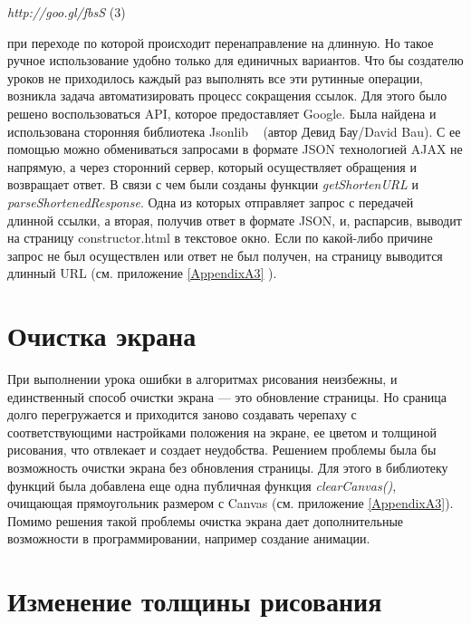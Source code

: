 \begin{center}
\vspace{6mm}
 \textit{ http://goo.gl/fbsS } (3)\par
\end{center}

при переходе по которой происходит перенаправление на длинную. Но такое ручное использование удобно только для единичных вариантов. Что бы создателю уроков не приходилось каждый раз выполнять все эти рутинные операции, возникла задача автоматизировать процесс сокращения ссылок. Для этого было решено воспользоваться API, которое предоставляет Google. Была найдена и использована сторонняя библиотека Jsonlib ~\cite{jsonlib} (автор Девид Бау/David Bau). С ее помощью можно обмениваться запросами в формате JSON технологией AJAX не напрямую, а через сторонний сервер, который осуществляет обращения и возвращает ответ. В связи с чем были созданы функции \textit{getShortenURL} и \textit{parseShortenedResponse}. Одна из которых отправляет запрос с передачей длинной ссылки, а вторая, получив ответ в формате JSON, и, распарсив, выводит на страницу constructor.html в текстовое окно. Если по какой-либо причине запрос не был осуществлен или ответ не был получен, на страницу выводится  длинный URL (см. приложение \ref{AppendixA3} ).



\section{Очистка экрана} \label{sect1_1}

При выполнении урока ошибки в алгоритмах рисования неизбежны, и единственный способ очистки экрана --- это обновление страницы. Но сраница долго перегружается и приходится заново создавать черепаху с соответствующими настройками положения на экране, ее цветом и толщиной рисования, что отвлекает и создает неудобства. Решением проблемы была бы возможность очистки экрана без обновления страницы. Для этого в библиотеку функций была добавлена еще одна публичная функция \textit{clearCanvas()}, очищающая прямоугольник размером с Canvas (см. приложение \ref{AppendixA3}). Помимо решения такой проблемы очистка экрана дает дополнительные возможности в программировании, например создание анимации.

\section{Изменение толщины рисования} \label{sect1_1}

